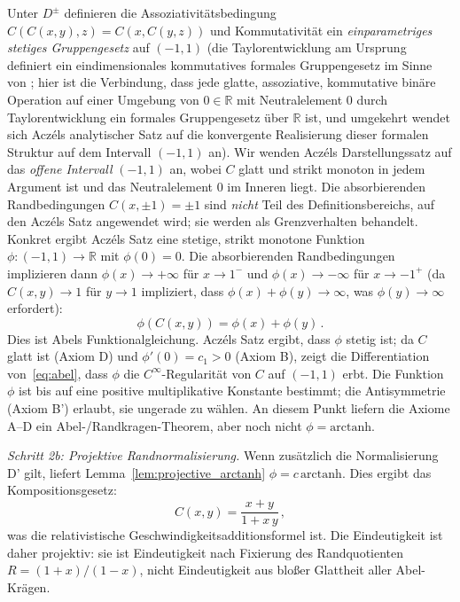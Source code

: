 \documentclass[aps,prd,twocolumn,superscriptaddress,nofootinbib]{revtex4-2}
\begin{document}
Unter $D^\pm$ definieren die Assoziativitätsbedingung $C(C(x,y),z) = C(x, C(y,z))$ und Kommutativität ein \textit{einparametriges stetiges Gruppengesetz} auf $(-1,1)$ (die Taylorentwicklung am Ursprung definiert ein eindimensionales kommutatives formales Gruppengesetz im Sinne von \cite{Hazewinkel1978}; hier ist die Verbindung, dass jede glatte, assoziative, kommutative binäre Operation auf einer Umgebung von $0 \in \mathbb{R}$ mit Neutralelement $0$ durch Taylorentwicklung ein formales Gruppengesetz über $\mathbb{R}$ ist, und umgekehrt wendet sich Aczéls analytischer Satz auf die konvergente Realisierung dieser formalen Struktur auf dem Intervall $(-1,1)$ an). Wir wenden Aczéls Darstellungssatz \cite{Aczel1966} auf das \textit{offene Intervall} $(-1,1)$ an, wobei $C$ glatt und strikt monoton in jedem Argument ist und das Neutralelement $0$ im Inneren liegt. Die absorbierenden Randbedingungen $C(x, \pm 1) = \pm 1$ sind \textit{nicht} Teil des Definitionsbereichs, auf den Aczéls Satz angewendet wird; sie werden als Grenzverhalten behandelt. Konkret ergibt Aczéls Satz eine stetige, strikt monotone Funktion $\phi: (-1,1) \to \mathbb{R}$ mit $\phi(0) = 0$. Die absorbierenden Randbedingungen implizieren dann $\phi(x) \to +\infty$ für $x \to 1^-$ und $\phi(x) \to -\infty$ für $x \to -1^+$ (da $C(x,y) \to 1$ für $y \to 1$ impliziert, dass $\phi(x) + \phi(y) \to \infty$, was $\phi(y) \to \infty$ erfordert):
\begin{equation}
\phi(C(x,y)) = \phi(x) + \phi(y)\,.
\label{eq:abel}
\end{equation}
Dies ist Abels Funktionalgleichung. Aczéls Satz ergibt, dass $\phi$ stetig ist; da $C$ glatt ist (Axiom D) und $\phi'(0) = c_1 > 0$ (Axiom B), zeigt die Differentiation von~\eqref{eq:abel}, dass $\phi$ die $C^\infty$-Regularität von $C$ auf $(-1,1)$ erbt. Die Funktion $\phi$ ist bis auf eine positive multiplikative Konstante bestimmt; die Antisymmetrie (Axiom B') erlaubt, sie ungerade zu wählen. An diesem Punkt liefern die Axiome A--D ein Abel-/Randkragen-Theorem, aber noch nicht $\phi=\mathrm{arctanh}$.

\textit{Schritt 2b: Projektive Randnormalisierung.}
Wenn zusätzlich die Normalisierung D' gilt, liefert Lemma~\ref{lem:projective_arctanh} $\phi=c\,\mathrm{arctanh}$. Dies ergibt das Kompositionsgesetz:
\begin{equation}
C(x, y) = \frac{x + y}{1 + x\,y}\,,
\label{eq:addition_formula}
\end{equation}
was die relativistische Geschwindigkeitsadditionsformel ist. Die Eindeutigkeit ist daher projektiv: sie ist Eindeutigkeit nach Fixierung des Randquotienten $R=(1+x)/(1-x)$, nicht Eindeutigkeit aus bloßer Glattheit aller Abel-Krägen.
\end{document}
